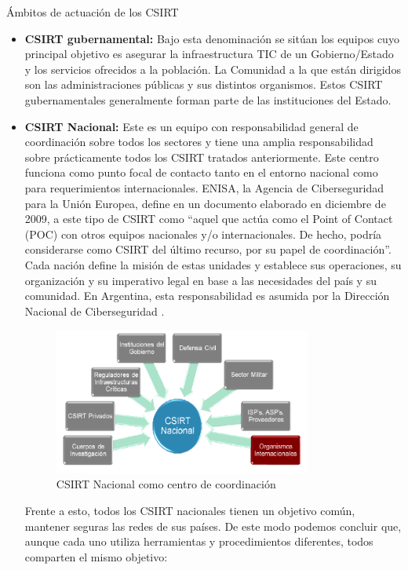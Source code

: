 \begin{section}{Ámbitos de actuación de los CSIRT}
\begin{itemize}
            \item \textbf{CSIRT gubernamental:} Bajo esta denominación se sitúan los equipos cuyo principal objetivo es asegurar la infraestructura TIC de un Gobierno/Estado y los servicios ofrecidos a la población. La Comunidad a la que están dirigidos son las administraciones públicas y sus distintos organismos. Estos CSIRT gubernamentales generalmente forman parte de las instituciones del Estado.
            \item \textbf{CSIRT Nacional:} Este es un equipo con responsabilidad general de coordinación sobre todos los sectores y tiene una amplia responsabilidad sobre prácticamente todos los CSIRT tratados anteriormente. Este centro funciona como punto focal de contacto tanto en el entorno nacional como para requerimientos internacionales. ENISA, la Agencia de Ciberseguridad para la Unión Europea, define en un documento \cite{enisa} elaborado en diciembre de 2009, a este tipo de CSIRT como “aquel que actúa como el Point of Contact (POC) con otros equipos nacionales y/o internacionales. De hecho, podría considerarse como CSIRT  del último recurso, por su papel de coordinación”. Cada nación define la misión de estas unidades y establece sus operaciones, su organización y su imperativo legal en base a las necesidades del país y su comunidad. En Argentina, esta responsabilidad es asumida por la Dirección Nacional de Ciberseguridad \cite{dir_nac_ciber}. 
            \begin{figure}[H]
                \centering
              \includegraphics[width=0.8\textwidth]{./marco_teorico_imagenes/figura_4_csirt_nacional.png}
                \caption{CSIRT Nacional como centro de coordinación}
                \label{fig:csirt_nac}
            \end{figure}
            \FloatBarrier
            Frente a esto, todos los CSIRT nacionales tienen un objetivo común, mantener seguras las redes de sus países. De este modo podemos concluir que, aunque cada uno utiliza herramientas y procedimientos diferentes, todos comparten el mismo objetivo:

\end{itemize}
\end{section}
